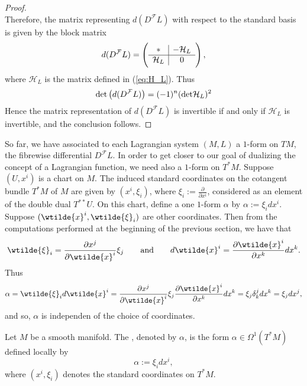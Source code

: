 \begin{proof}
\begin{equation*}
	\end{equation*}
	Therefore, the matrix representing $d(D^\mathcal{F}L)$ with respect to the standard basis is given by the block matrix
	\begin{equation*}
		d(D^\mathcal{F}L) = \del{\begin{array}{c|c}
			* & -\mathcal{H}_L\\\hline
			\mathcal{H}_L & 0
		\end{array}},
	\end{equation*}
	\noindent where $\mathcal{H}_L$ is the matrix defined in (\ref{eq:H_L}). Thus 
	\begin{equation*}
		\det\del[1]{d(D^\mathcal{F}L)} = (-1)^n(\det \mathcal{H}_L)^2
	\end{equation*}
	Hence the matrix representation of $d(D^\mathcal{F}L)$ is invertible if and only if $\mathcal{H}_L$ is invertible, and the conclusion follows.
\end{proof}

So far, we have associated to each Lagrangian system $(M,L)$ a $1$-form on $TM$, the fibrewise differential $D^\mathcal{F}L$. In order to get closer to our goal of dualizing the concept of a Lagrangian function, we need also a $1$-form on $T^*M$. Suppose $(U,x^i)$ is a chart on $M$. The induced standard coordinates on the cotangent bundle $T^*M$ of $M$ are given by $(x^i,\xi_i)$, where $\xi_i := \frac{\partial}{\partial x^i}$, considered as an element of the double dual $T^{**}U$. On this chart, define a one $1$-form $\alpha$ by $\alpha := \xi_i dx^i$. Suppose $(\wtilde{x}^i,\wtilde{\xi}_i)$ are other coordinates. Then from the computations performed at the beginning of the previous section, we have that
\begin{equation*}
	\wtilde{\xi}_i = \frac{\partial x^j}{\partial \wtilde{x}^i}\xi_j \qquad \text{and} \qquad d\wtilde{x}^i = \frac{\partial \wtilde{x}^i}{\partial x^k}dx^k.
\end{equation*}
Thus
\begin{equation*}
	\alpha = \wtilde{\xi}_i d\wtilde{x}^i = \frac{\partial x^j}{\partial \wtilde{x}^i}\xi_j\frac{\partial \wtilde{x}^i}{\partial x^k}dx^k = \xi_j \delta^j_k dx^k = \xi_j dx^j,
\end{equation*}
\noindent and so, $\alpha$ is independen of the choice of coordinates.

\begin{definition}
	\label{def:tautological_form}
	Let $M$ be a smooth manifold. The , denoted by $\alpha$, is the form  $\alpha \in \Omega^1(T^*M)$ defined locally by
	\begin{equation*}
		\alpha := \xi_idx^i,
	\end{equation*}
	\noindent where $(x^i,\xi_i)$ denotes the standard coordinates on $T^*M$.
\end{definition}

